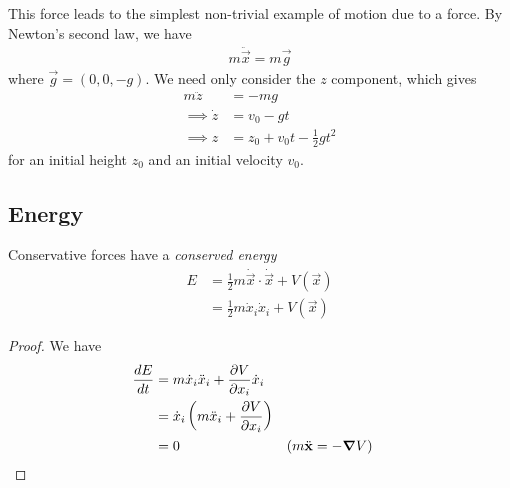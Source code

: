 \documentclass{../../template/note}
\begin{document}
    This force leads to the simplest non-trivial example of motion due to a force. By Newton's second law, we have
    \begin{align*}
        m \ddot{\vec x} = m \vec g
    \end{align*}
    where \(\vec g = (0, 0, -g)\). We need only consider the \(z\) component, which gives
    \begin{align*}
        m \ddot z &= -mg \\
        \implies \dot z &= v_0 - gt \\
        \implies z &= z_0 + v_0t - \frac{1}{2}gt^2
    \end{align*}
    for an initial height \(z_0\) and an initial velocity \(v_0\).

    \subsection{Energy}

    \begin{proposition}
        Conservative forces have a \emph{conserved energy}
        \begin{align*}
            E &= \frac{1}{2} m \dot{\vec x} \cdot \dot{\vec x} + V(\vec x) \\
            &= \frac{1}{2} m \dot x_i \dot x_i + V(\vec x)
        \end{align*}
    \end{proposition}
    
    \begin{proof}
        We have
        \begin{align*}
            \frac{dE}{dt} &= m \dot x_i\ddot x_i + \pd{V}{x_i} \dot x_i \\
            &= \dot x_i \left(m \ddot x_i + \pd{V}{x_i}\right) \\
            &= 0 && (m \ddot{\vec x} = -\grad V)
        \end{align*}
    \end{proof}
    
\end{document}
